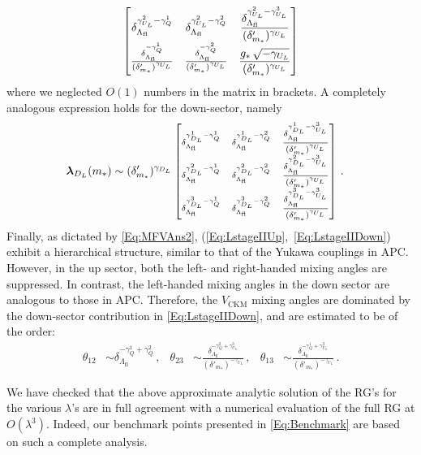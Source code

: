 \documentclass[aps,prl,twocolumn,showpacs,10pt,preprintnumbers,nofootinbib]{revtex4-2}
\newcommand{\gst}{g_*}
\newcommand{\mst}{m_*}
\newcommand{\Lfl}{\Lambda_{\text{fl}}}
\begin{document}
{\begin{align}
\begin{bmatrix}
\delta_{\Lfl}^{\gamma_{U_L}^2-\gamma_Q^1} & \delta_{\Lfl}^{\gamma_{U_L}^2-\gamma_Q^2} & \dfrac{\delta_{\Lfl}^{\gamma_{U_L}^2-\gamma_{U_L}^3}}{(\delta'_{\mst})^{\gamma_{U_L}}} \\
\frac{\delta_{\Lfl}^{-\gamma_Q^1}}{(\delta'_{\mst})^{\gamma_{U_L}}} & \frac{\delta_{\Lfl}^{-\gamma_Q^2}}{(\delta'_{\mst})^{\gamma_{U_L}}} & \dfrac{\gst\,\sqrt{-\gamma_{U_L}}}{(\delta'_{\mst})^{\gamma_{U_L}}}
\end{bmatrix}
\normalsize
\end{align}
where we neglected $O(1)$ numbers in the matrix in brackets. A completely analogous expression holds for the down-sector, namely
\begin{align}\label{Eq:LstageIIDown}
\boldsymbol{\lambda}_{D_L}(\mst) &\sim (\delta'_{\mst})^{\gamma_{D_L}}
\scriptsize
\begin{bmatrix}
\delta_{\Lfl}^{\gamma_{D_L}^1 - \gamma_Q^1} & \delta_{\Lfl}^{\gamma_{D_L}^1 - \gamma_Q^2} & \dfrac{\delta_{\Lfl}^{\gamma_{D_L}^1 - \gamma_{U_L}^3}}{(\delta'_{\mst})^{\gamma_{U_L}}} \\
\delta_{\Lfl}^{\gamma_{D_L}^2 - \gamma_Q^1} & \delta_{\Lfl}^{\gamma_{D_L}^2 - \gamma_Q^2} & \dfrac{\delta_{\Lfl}^{\gamma_{D_L}^2 - \gamma_{U_L}^3}}{(\delta'_{\mst})^{\gamma_{U_L}}} \\
\delta_{\Lfl}^{\gamma_{D_L}^3 - \gamma_Q^1} & \delta_{\Lfl}^{\gamma_{D_L}^3 - \gamma_Q^2} & \dfrac{\delta_{\Lfl}^{\gamma_{D_L}^3 - \gamma_{U_L}^3}}{(\delta'_{\mst})^{\gamma_{U_L}}}
\end{bmatrix}
\normalsize
\,.
\end{align} 
Finally, as dictated by \eqref{Eq:MFVAns2}, (\ref{Eq:LstageIIUp},~\ref{Eq:LstageIIDown}) exhibit a hierarchical structure, similar to that of the Yukawa couplings in APC. However, in the up sector, both the left- and right-handed mixing angles are suppressed. In contrast, the left-handed mixing angles in the down sector are analogous to those in APC. Therefore, the $V_{\text{CKM}}$ mixing angles are dominated by the down-sector contribution in \eqref{Eq:LstageIIDown}, and are estimated to be of the order:
\begin{align}
    \theta_{12} &\sim \delta_{\Lfl}^{-\gamma_Q^1+\gamma_Q^2}\,, 
    & \theta_{23} &\sim \frac{\delta_{\Lfl}^{-\gamma_Q^2+\gamma_{U_L}^3}}{(\delta'_{\mst})^{-\gamma_{U_L}}}\,, 
    & \theta_{13} &\sim \frac{\delta_{\Lfl}^{-\gamma_Q^1+\gamma_{U_L}^3}}{(\delta'_{\mst})^{-\gamma_{U_L}}}\,.
\end{align}

We have checked that the above approximate analytic solution of the RG's for the various $\lambda$'s are in full agreement with a numerical evaluation of the full RG at $O(\lambda^3)$. Indeed, our benchmark points presented in \eqref{Eq:Benchmark} are based on such a complete analysis.
%

}
\end{document}
